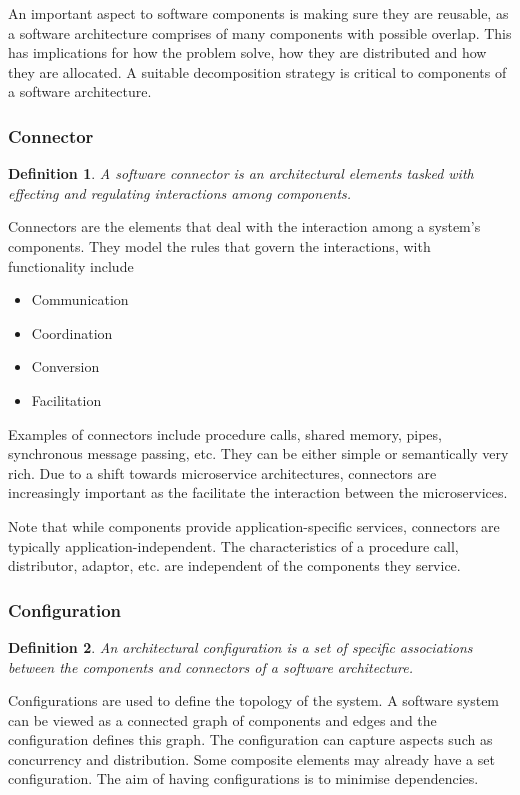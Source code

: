 \documentclass{sty/SizheArticle}
\newtheorem{definition}{Definition}
\begin{document}
An important aspect to software components is making sure they are reusable, as
a software architecture comprises of many components with possible overlap. 
This has implications for how the problem solve, how they are distributed
and how they are allocated. A suitable decomposition strategy is critical
to components of a software architecture.
\subsubsection{Connector}
\begin{definition}
A software connector is an architectural elements tasked with effecting and
regulating interactions among components.
\end{definition}

Connectors are the elements that deal with the interaction among a system's
components. They model the rules that govern the interactions, with functionality
include
\begin{itemize}
\item Communication
\item Coordination
\item Conversion
\item Facilitation
\end{itemize}

Examples of connectors include procedure calls, shared memory, pipes,
synchronous message passing, etc. They can be either simple or semantically
very rich. Due to a shift towards microservice architectures, connectors
are increasingly important as the facilitate the interaction between
the microservices.

Note that while components provide application-specific services, connectors
are typically application-independent. The characteristics of a procedure call,
distributor, adaptor, etc. are independent of the components they service.

\subsubsection{Configuration}
\begin{definition}
An architectural configuration is a set of specific associations between
the components and connectors of a software architecture.
\end{definition}

Configurations are used to define the topology of the system. A software
system can be viewed as a connected graph of components and edges and
the configuration defines this graph. The configuration can capture aspects
such as concurrency and distribution. Some composite elements may already
have a set configuration. The aim of having configurations is to minimise
dependencies.
\end{document}
